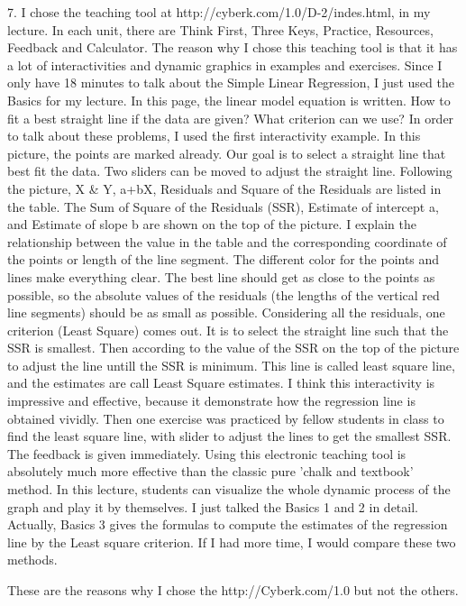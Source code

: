 7. I chose the teaching tool at http://cyberk.com/1.0/D-2/indes.html, in my 
lecture. In each unit, there are Think First, Three Keys, Practice, Resources, 
Feedback and Calculator. The reason why I chose this teaching tool is that it 
has a lot of interactivities and dynamic graphics in examples and exercises. 
Since I only have 18 minutes to talk about the Simple Linear Regression, I 
just used the Basics for my lecture. In this page, the linear model equation 
is written. How to fit a best straight line if the data are given? What 
criterion can we use? In order to talk about these problems, I used the first 
interactivity example. In this picture, the points are marked already. Our 
goal is to select a straight line that best fit the data. Two sliders can be 
moved to adjust the straight line. Following the picture, X & Y, a+bX, 
Residuals and Square of the Residuals are listed in the table. The Sum of 
Square of the Residuals (SSR), Estimate of intercept a, and Estimate of slope 
b are shown on the top of the picture. I explain the relationship between the 
value in the table and the corresponding coordinate of the points or length of 
the line segment. The different color for the points and lines make everything 
clear. The best line should get as close to the points as possible, so the 
absolute values of the residuals (the lengths of the vertical red line 
segments) should be as small as possible. Considering all the residuals, one 
criterion (Least Square) comes out. It is to select the straight line such 
that the SSR is smallest. Then according to the value of the SSR on the top of 
the picture to adjust the line untill the SSR is minimum. This line is called 
least square line, and the estimates are call Least Square estimates. I think 
this interactivity is impressive and effective, because it demonstrate how the 
regression line is obtained vividly. Then one exercise was practiced by fellow 
students in class to find the least square line, with slider to adjust the 
lines to get the smallest SSR. The feedback is given immediately. Using this 
electronic teaching tool is absolutely much more effective than the classic 
pure 'chalk and textbook' method. In this lecture, students can visualize the 
whole dynamic process of the graph and play it by themselves. I just talked 
the Basics 1 and 2 in detail. Actually, Basics 3 gives the formulas to compute 
the estimates of the regression line by the Least square criterion. If I had 
more time, I would compare these two methods.

These are the reasons why I chose the http://Cyberk.com/1.0 but not the 
others.


